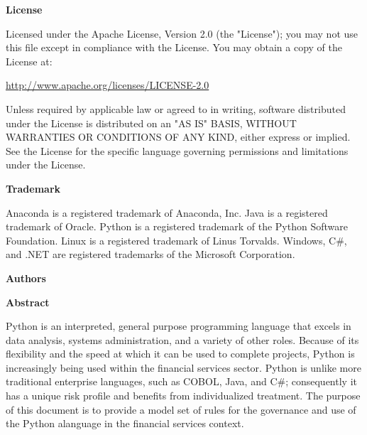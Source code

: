 \COPYRIGHT

\textbf{License}

Licensed under the Apache License, Version 2.0 (the "License"); you may not use this file except in compliance with the License. You may obtain a copy of the License at:

\url{http://www.apache.org/licenses/LICENSE-2.0}

Unless required by applicable law or agreed to in writing, software distributed under the License is distributed on an "AS IS" BASIS, WITHOUT WARRANTIES OR CONDITIONS OF ANY KIND, either express or implied. See the License for the specific language governing permissions and limitations under the License.

\textbf{Trademark}

Anaconda is a registered trademark of Anaconda, Inc. Java is a registered trademark of Oracle. Python is a registered trademark of the Python Software Foundation. Linux is a registered trademark of Linus Torvalds. Windows, C\#, and .NET are registered trademarks of the Microsoft Corporation.

\textbf{Authors}

\AUTHORS

\textbf{Abstract}

Python is an interpreted, general purpose programming language that excels in data analysis, systems administration, and a variety of other roles. Because of its flexibility and the speed at which it can be used to complete projects, Python is increasingly being used within the financial services sector. Python is unlike more traditional enterprise languages, such as COBOL, Java, and C\#; consequently it has a unique risk profile and benefits from individualized treatment. The purpose of this document is to provide a model set of rules for the governance and use of the Python alanguage in the financial services context.
